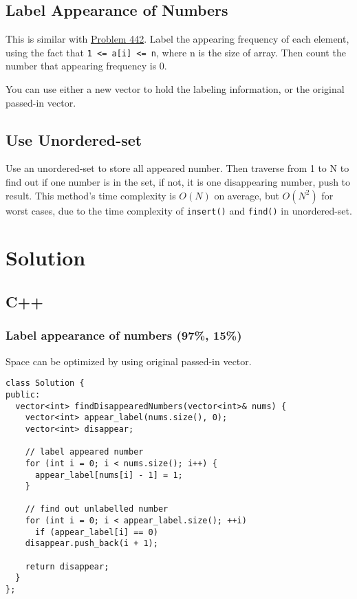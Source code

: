 \documentclass[12pt]{book}
\begin{document}
\subsection{Label Appearance of Numbers}
\label{sec:org3c658f7}
This is similar with \hyperref[orgb2f1edb]{Problem 442}. Label the appearing frequency of each element, using the fact that \texttt{1 <= a[i] <= n}, where n is the size of array. Then count the number that appearing frequency is 0.

You can use either a new vector to hold the labeling information, or the original passed-in vector.

\subsection{Use Unordered-set}
\label{sec:org377d6ef}
Use an unordered-set to store all appeared number. Then traverse from 1 to N to find out if one number is in the set, if not, it is one disappearing number, push to result. This method's time complexity is \(O(N)\) on average, but \(O(N^2)\) for worst cases, due to the time complexity of \texttt{insert()} and \texttt{find()} in unordered-set.

\section{Solution}
\label{sec:org11c52b2}
\subsection{C++}
\label{sec:org1bd74b9}
\subsubsection{Label appearance of numbers (97\%, 15\%)}
\label{sec:org1c45a99}
Space can be optimized by using original passed-in vector.
\begin{verbatim}
class Solution {
public:
  vector<int> findDisappearedNumbers(vector<int>& nums) {
    vector<int> appear_label(nums.size(), 0);
    vector<int> disappear;

    // label appeared number
    for (int i = 0; i < nums.size(); i++) {
      appear_label[nums[i] - 1] = 1;
    }

    // find out unlabelled number 
    for (int i = 0; i < appear_label.size(); ++i)
      if (appear_label[i] == 0)
	disappear.push_back(i + 1);

    return disappear;
  }
};
\end{verbatim}
\end{document}
